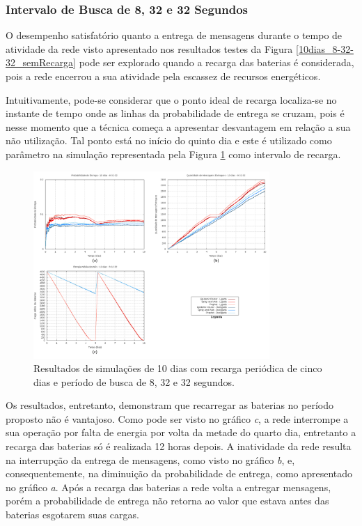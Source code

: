 \subsubsection{Intervalo de Busca de 8, 32 e 32 Segundos}
\label{8-32-32_comRecarga}

O desempenho satisfatório quanto a entrega de mensagens durante o tempo de atividade da rede visto apresentado nos resultados testes da Figura \ref{10dias_8-32-32_semRecarga} pode ser explorado quando a recarga das baterias é considerada, pois a rede encerrou a sua atividade pela escassez de recursos energéticos.

Intuitivamente, pode-se considerar que o ponto ideal de recarga localiza-se no instante de tempo onde as linhas da probabilidade de entrega se cruzam, pois é nesse momento que a técnica começa a apresentar desvantagem em relação a sua não utilização. Tal ponto está no início do quinto dia e este é utilizado como parâmetro na simulação representada pela Figura \ref{10dias_8-32-32_comRecarga_450000} como intervalo de recarga.

\begin{figure}
\centering
\includegraphics[width=0.8\textwidth]{figuras/cap_5/graficos/8_32_32/MessageDeliveryReport_10_8-32-32_withRecharge_450000.png}
\caption{Resultados de simulações de 10 dias com recarga periódica de cinco dias e período de busca de 8, 32 e 32 segundos.}
\label{10dias_8-32-32_comRecarga_450000}
\end{figure}

Os resultados, entretanto, demonstram que recarregar as baterias no período proposto não é vantajoso. Como pode ser visto no gráfico \emph{c}, a rede interrompe a sua operação por falta de energia por volta da metade do quarto dia, entretanto a recarga das baterias só é realizada 12 horas depois. A inatividade da rede resulta na interrupção da entrega de mensagens, como visto no gráfico \emph{b}, e, consequentemente, na diminuição da probabilidade de entrega, como apresentado no gráfico \emph{a}. Após a recarga das baterias a rede volta a entregar mensagens, porém a probabilidade de entrega não retorna ao valor que estava antes das baterias esgotarem suas cargas.

